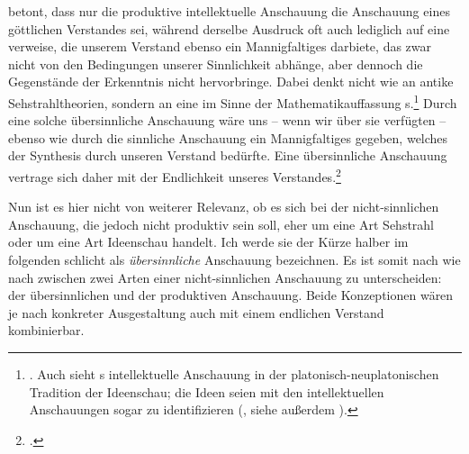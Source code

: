  betont, dass nur die
produktive intellektuelle Anschauung die Anschauung eines
göttlichen Verstandes sei, während derselbe Ausdruck oft auch lediglich auf eine
 verweise, die unserem Verstand ebenso ein Mannigfaltiges darbiete, das
zwar nicht von den Bedingungen unserer Sinnlichkeit abhänge, aber dennoch die
Gegenstände der Erkenntnis nicht hervorbringe. Dabei denkt
 nicht wie
 an antike Sehstrahltheorien,
sondern an eine  im Sinne der Mathematikauffassung
s.\footnote{\cite[Vgl.][96]{Prien:KantsLogikderBegriffe2006}.
Auch  sieht
s intellektuelle Anschauung in der
platonisch-neuplatonischen Tradition der Ideenschau; die Ideen seien mit den
intellektuellen Anschauungen sogar zu identifizieren
\mkbibparens{\cite[vgl.][\pno~144\,f.,]{Duesing:NaturteleologieundMetaphysikbeiKantundHegel1990},
siehe außerdem
\cite[][\pno~72\,f.]{Duesing:DieTeleologieinKantsWeltbegriff1968}}.} Durch eine
solche übersinnliche Anschauung wäre uns -- wenn wir über sie verfügten --
ebenso wie durch die sinnliche Anschauung ein Mannigfaltiges gegeben, welches
der Synthesis durch unseren Verstand bedürfte. Eine übersinnliche Anschauung
vertrage sich daher mit der Endlichkeit unseres
Verstandes.\footnote{\cite[Vgl.][97]{Prien:KantsLogikderBegriffe2006}.}

Nun ist es hier nicht von weiterer Relevanz, ob es sich bei der nicht-sinnlichen
Anschauung, die jedoch nicht produktiv sein soll, eher um eine Art Sehstrahl
oder um eine Art Ideenschau handelt. Ich werde sie der Kürze halber im folgenden
schlicht als \emph{übersinnliche} Anschauung bezeichnen. Es ist somit nach
 wie nach 
zwischen zwei Arten einer nicht-sinnlichen Anschauung zu unterscheiden:
der übersinnlichen und der produktiven Anschauung. Beide Konzeptionen
wären je nach konkreter Ausgestaltung auch mit einem endlichen
Verstand kombinierbar.

